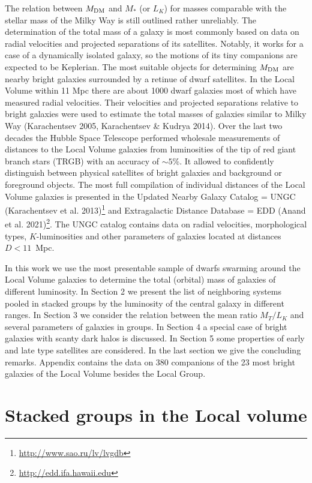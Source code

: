 \documentclass[proof]{WileyASNA-v1}
\begin{document}
The relation between $M_{\rm DM}$ and $M_*$ (or $L_K$) for masses comparable
with the stellar mass of the Milky Way is still outlined rather unreliably. The
determination of the total mass of a galaxy is most commonly based on data on
radial velocities and projected separations of its satellites. Notably, it works
for a case of a dynamically isolated galaxy, so the motions of its tiny
companions are expected to be Keplerian. The most suitable objects for
determining $M_{\rm DM}$ are nearby bright galaxies surrounded by a retinue of
dwarf satellites. In the Local Volume within 11 Mpc there are about 1000 dwarf
galaxies most of which have measured radial velocities. Their velocities and
projected separations relative to bright galaxies were used to estimate the
total masses of galaxies similar to Milky Way (Karachentsev 2005, Karachentsev
\& Kudrya 2014). Over the last two decades the Hubble Space Telescope performed
wholesale measurements of distances to the Local Volume galaxies from
luminosities of the tip of red giant branch stars (TRGB) with an accuracy of
$\sim5$\%. It allowed to confidently distinguish between physical satellites of
bright galaxies and background or foreground objects. The most full compilation
of individual distances of the Local Volume galaxies is presented in the Updated
Nearby Galaxy Catalog = UNGC (Karachentsev et al.
2013)\footnote{\url{http://www.sao.ru/lv/lvgdb}} and Extragalactic Distance
Database = EDD (Anand et al. 2021)\footnote{\url{http://edd.ifa.hawaii.edu}}.
The UNGC catalog contains data on radial velocities, morphological types,
$K$-luminosities and other parameters of galaxies located at distances
$D<11$~Mpc.

In this work we use the most presentable sample of dwarfs swarming around the
Local Volume galaxies to determine the total (orbital) mass of galaxies of
different luminosity. In Section 2 we present the list of neighboring systems
pooled in stacked groups by the luminosity of the central galaxy in different
ranges. In Section 3 we consider the relation between the mean ratio $M_T/L_K$
and several parameters of galaxies in groups. In Section 4 a special case of
bright galaxies with scanty dark halos is discussed. In Section 5 some
properties of early and late type satellites are considered. In the last section
we give the concluding remarks. Appendix contains the data on 380 companions of
the 23 most bright galaxies of the Local Volume besides the Local Group.

\section{Stacked groups in the Local volume}\label{sec2}
\end{document}
